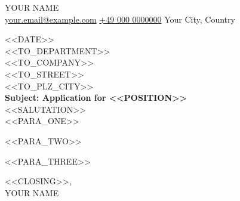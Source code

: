 \documentclass[11pt]{letter}
\begin{document}
\AddToShipoutPictureBG{%
  \color{gr}
  \AtPageUpperLeft{\rule[-1.0in]{\paperwidth}{1.1in}}
}

\begin{center}
    {\fontsize{24}{0}\selectfont\scshape \textcolor{UI_blue}{YOUR NAME}}\\
    \vspace{0.1in}
    \small
    \textcolor{UI_blue}{\href{mailto:your.email@example.com}{\faEnvelope\enspace your.email@example.com} \quad
    \href{tel:+490000000000}{\faPhone\enspace +49 000 0000000} \quad
    \faMapMarker\enspace Your City, Country}
\end{center}

\vspace{0.3in}

<<DATE>>\\

\vspace{-0.1in}
<<TO_DEPARTMENT>>\\
<<TO_COMPANY>>\\
<<TO_STREET>>\\
<<TO_PLZ_CITY>>\\

\vspace{-0.1in}
\textbf{Subject: Application for <<POSITION>>}\\

\vspace{-0.1in} <<SALUTATION>>\\

\vspace{-0.1in}
\setlength\parindent{20pt}
\noindent <<PARA_ONE>>

\vspace{0.1in}
\noindent <<PARA_TWO>>

\vspace{0.1in}
\noindent <<PARA_THREE>>

\vspace{0.2in}

\begin{flushright}
<<CLOSING>>,\\
\vspace{0.15in}
YOUR NAME
\end{flushright}
\end{document}
